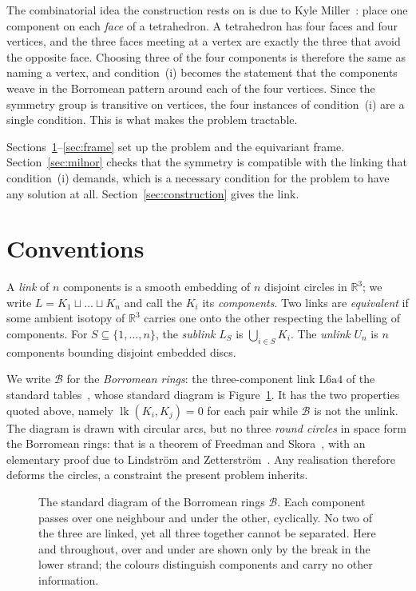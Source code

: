 \documentclass[11pt,a4paper]{article}
\theoremstyle{plain}
\theoremstyle{definition}
\newcommand{\RR}{\mathbb{R}}
\newcommand{\lk}{\operatorname{lk}}
\newcommand{\Bor}{\mathcal{B}}
\begin{document}
The combinatorial idea the construction rests on is due to Kyle
Miller~\cite{miller2018}: place one component on each \emph{face} of a
tetrahedron. A tetrahedron has four faces and four vertices, and the three faces
meeting at a vertex are exactly the three that avoid the opposite face. Choosing
three of the four components is therefore the same as naming a vertex, and
condition~(i) becomes the statement that the components weave in the Borromean
pattern around each of the four vertices. Since the symmetry group is transitive
on vertices, the four instances of condition~(i) are a single condition. This is
what makes the problem tractable.

Sections~\ref{sec:defs}--\ref{sec:frame} set up the problem and the equivariant
frame. Section~\ref{sec:milnor} checks that the symmetry is compatible with the
linking that condition~(i) demands, which is a necessary condition for the
problem to have any solution at all. Section~\ref{sec:construction} gives the link.

\section{Conventions}\label{sec:defs}

A \emph{link} of $n$ components is a smooth embedding of $n$ disjoint circles in
$\RR^3$; we write $L=K_1\sqcup\dots\sqcup K_n$ and call the $K_i$ its
\emph{components}. Two links are \emph{equivalent} if some ambient isotopy of
$\RR^3$ carries one onto the other respecting the labelling of components. For
$S\subseteq\{1,\dots,n\}$, the \emph{sublink} $L_S$ is $\bigcup_{i\in S}K_i$.
The \emph{unlink} $U_n$ is $n$ components bounding disjoint embedded discs.

We write $\Bor$ for the \emph{Borromean rings}: the three-component link
$\mathrm{L6a4}$ of the standard tables~\cite{linkinfo}, whose standard diagram is Figure~\ref{fig:borromean}.
It has the two properties quoted above, namely $\lk(K_i,K_j)=0$ for each pair
while $\Bor$ is not the unlink. The diagram is drawn with circular arcs, but no
three \emph{round circles} in space form the Borromean rings: that is a theorem
of Freedman and Skora~\cite{freedmanskora1987}, with an elementary proof due to
Lindström and Zetterström~\cite{lindstrom1991}. Any realisation therefore
deforms the circles, a constraint the present problem inherits.

\begin{figure}[htbp]
\centering

\caption{The standard diagram of the Borromean rings $\Bor$. Each component
passes over one neighbour and under the other, cyclically. No two of the three
are linked, yet all three together cannot be separated. Here and throughout,
over and under are shown only by the break in the lower strand; the colours
distinguish components and carry no other information.}
\label{fig:borromean}
\end{figure}
\end{document}

